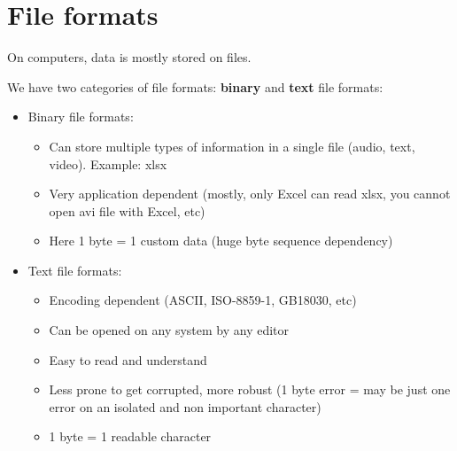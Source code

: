 \documentclass[handout]{beamer}[10pt, usepdftitle=false]
\begin{document}
	\section{File formats}	
	
	\begin{frame}
	
	On computers, data is mostly stored on files. 
	\vspace*{0.6em}
	
	We have two categories of file formats: \textbf{binary} and \textbf{text} file formats:
 	 	
	\begin{itemize}
		\item{Binary file formats: 
				\begin{itemize}
					\item{Can store multiple types of information in a single file (audio, text, video). Example: xlsx}
					\item{Very application dependent (mostly, only Excel can read xlsx, you cannot open avi file with Excel, etc)}
					\item{Here 1 byte = 1 custom data (huge byte sequence dependency)}
				\end{itemize}				
		 }
		\item{Text file formats: 
			\begin{itemize}
				\item{Encoding dependent (ASCII, ISO-8859-1, GB18030, etc)}
				\item{Can be opened on any system by any editor}
				\item{Easy to read and understand}
				\item{Less prone to get corrupted, more robust (1 byte error = may be just one error on an isolated and non important character)}
				\item{1 byte = 1 readable character}
			\end{itemize}							
		}
	\end{itemize}
		
	\end{frame}		
		
\end{document}
